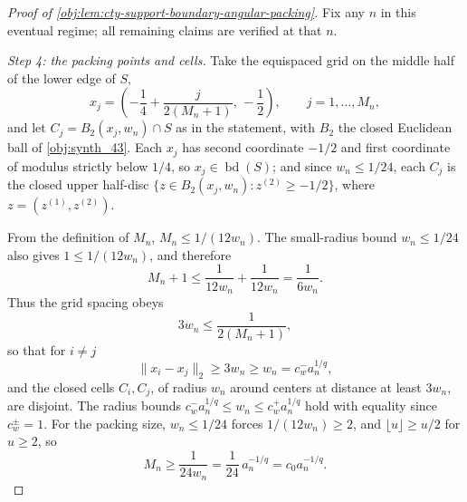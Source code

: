 \documentclass[11pt]{article}
\begin{document}
\begin{proof}[Proof of \cref{obj:lem:cty-support-boundary-angular-packing}]
Fix any \(n\) in this eventual regime; all remaining claims are verified at that \(n\).

\emph{Step 4: the packing points and cells.}  Take the equispaced grid on the middle half of the lower edge of \(S\),
\[
x_j=\left(-\frac14+\frac{j}{2(M_n+1)},\,-\frac12\right),
\qquad j=1,\ldots,M_n,
\]
and let \(C_j=B_2(x_j,w_n)\cap S\) as in the statement, with \(B_2\) the closed Euclidean ball of \cref{obj:synth_43}.  Each \(x_j\) has second coordinate \(-1/2\) and first coordinate of modulus strictly below \(1/4\), so \(x_j\in\operatorname{bd}(S)\); and since \(w_n\le1/24\), each \(C_j\) is the closed upper half-disc \(\{z\in B_2(x_j,w_n):z^{(2)}\ge-1/2\}\), where \(z=(z^{(1)},z^{(2)})\).

From the definition of \(M_n\), \(M_n\le 1/(12w_n)\).  The small-radius bound \(w_n\le1/24\) also gives \(1\le1/(12w_n)\), and therefore
\[
M_n+1\le \frac{1}{12w_n}+\frac{1}{12w_n}=\frac1{6w_n}.
\]
Thus the grid spacing obeys
\[
3w_n\le\frac1{2(M_n+1)} ,
\]
so that for \(i\ne j\)
\[
\lVert x_i-x_j\rVert_2\ge 3w_n\ge w_n=c_w^-a_n^{1/q},
\]
and the closed cells \(C_i,C_j\), of radius \(w_n\) around centers at distance at least \(3w_n\), are disjoint.
The radius bounds \(c_w^-a_n^{1/q}\le w_n\le c_w^+a_n^{1/q}\) hold with equality since \(c_w^\pm=1\).  For the packing size, \(w_n\le1/24\) forces \(1/(12w_n)\ge2\), and \(\lfloor u\rfloor\ge u/2\) for \(u\ge2\), so
\[
M_n\ge\frac1{24w_n}=\frac1{24}\,a_n^{-1/q}=c_0a_n^{-1/q}.
\]


\end{proof}
\end{document}
